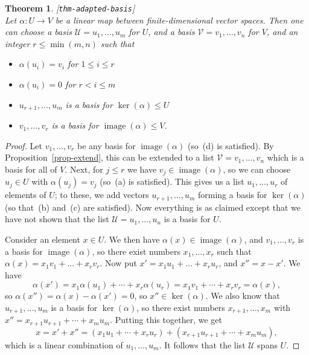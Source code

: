 \documentclass{amsart}
\newcommand{\lbl}[1]{\label{#1}\textup{[\texttt{#1}]}\ \\}
\newcommand{\lbl}{\label}
\newcommand{\img}       {\operatorname{image}}
\newcommand{\al}        {\alpha}
\newcommand{\CU}        {{\mathcal{U}}}
\newcommand{\CV}        {{\mathcal{V}}}
\renewcommand{\:}       {\colon}
\newtheorem{theorem}{Theorem}[section]
\theoremstyle{definition}
\begin{document}
\begin{theorem}\lbl{thm-adapted-basis}
 Let $\al\:U\to V$ be a linear map between
 finite-dimensional vector spaces.  Then one can choose a
 basis $\CU=u_1,\dotsc,u_m$ for $U$, and a basis
 $\CV=v_1,\dotsc,v_n$ for $V$, and an integer
 $r\leq\min(m,n)$ such that 
 \begin{itemize}
  \item[(a)] $\al(u_i)=v_i$ for $1\leq i\leq r$
  \item[(b)] $\al(u_i)=0$ for $r<i\leq m$
  \item[(c)] $u_{r+1},\dotsc,u_m$ is a basis for
   $\ker(\al)\leq U$
  \item[(d)] $v_1,\dotsc,v_r$ is a basis for
   $\img(\al)\leq V$.
 \end{itemize}
\end{theorem}
\begin{proof}
 Let $v_1,\dotsc,v_r$ be any basis for $\img(\al)$ (so~(d)
 is satisfied).  By Proposition~\ref{prop-extend}, this can
 be extended to a list $\CV=v_1,\dotsc,v_n$ which is a basis
 for all of $V$.  Next, for $j\leq r$ we have
 $v_j\in\img(\al)$, so we can choose $u_j\in U$ with
 $\al(u_j)=v_j$ (so~(a) is satisfied).  This gives us a list
 $u_1,\dotsc,u_r$ of elements of $U$; to these, we add
 vectors $u_{r+1},\dotsc,u_m$ forming a basis for
 $\ker(\al)$ (so that~(b) and~(c) are satisfied).  Now
 everything is as claimed except that we have not shown that
 the list $\CU=u_1,\dotsc,u_n$ is a basis for $U$.  

 Consider an element $x\in U$.  We then have
 $\al(x)\in\img(\al)$, and $v_1,\dotsc,v_r$ is a basis for
 $\img(\al)$, so there exist numbers $x_1,\dotsc,x_r$ such
 that $\al(x)=x_1v_1+\dotsc+x_rv_r$.  Now put
 $x'=x_1u_1+\dotsc+x_ru_r$, and $x''=x-x'$.  We have 
 \[ \al(x') = x_1\al(u_1) + \dotsb + x_r\al(u_r) 
     = x_1v_1 + \dotsb + x_rv_r = \al(x),
 \]
 so $\al(x'')=\al(x)-\al(x')=0$, so $x''\in\ker(\al)$.  We
 also know that $u_{r+1},\dotsc,u_m$ is a basis for
 $\ker(\al)$, so there exist numbers $x_{r+1},\dotsc,x_m$
 with $x''=x_{r+1}u_{r+1}+\dotsb+x_mu_m$.  Putting this
 together, we get
 \[ x = x'+x'' = (x_1u_1+\dotsb+x_ru_r) + 
                 (x_{r+1}u_{r+1}+\dotsb+x_mu_m),
 \]
 which is a linear combination of $u_1,\dotsc,u_m$.  It
 follows that the list $\CU$ spans $U$.  


\end{proof}
\end{document}
